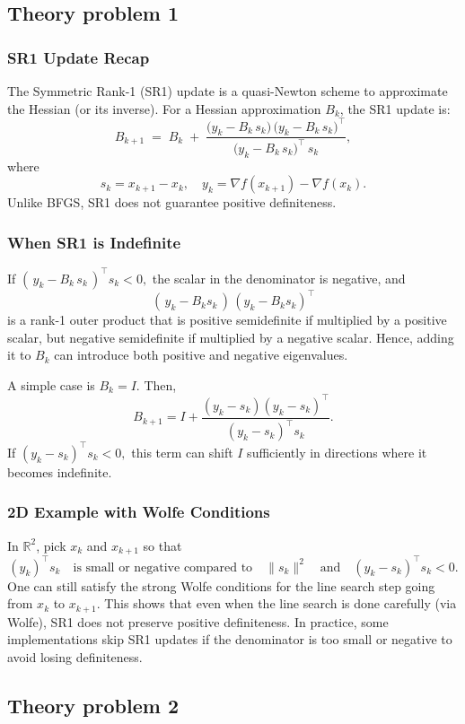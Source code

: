 \documentclass[a4paper,12pt]{article}
\begin{document}
\subsection{Theory problem 1}
\subsubsection*{SR1 Update Recap}
The Symmetric Rank-1 (SR1) update is a quasi-Newton scheme to approximate the Hessian (or its inverse). For a Hessian approximation $B_k$, the SR1 update is:
\[
  B_{k+1} 
  \;=\; 
  B_k 
  \;+\;
  \frac{\bigl(y_k - B_k \, s_k \bigr)\,\bigl(y_k - B_k \, s_k \bigr)^\top}
       {\bigl(y_k - B_k \, s_k \bigr)^\top \, s_k},
\]
where 
\[
  s_k = x_{k+1} - x_k, 
  \quad
  y_k = \nabla f(x_{k+1}) - \nabla f(x_k).
\]
Unlike BFGS, SR1 does not guarantee positive definiteness.

\subsubsection*{When SR1 is Indefinite}
If $(\,y_k - B_k\,s_k\,)^\top s_k < 0,$ the scalar in the denominator is negative, and
\[
  (\,y_k - B_k s_k\,)\,(y_k - B_k s_k)^\top
\]
is a rank-1 outer product that is positive semidefinite if multiplied by a positive scalar, but negative semidefinite if multiplied by a negative scalar. Hence, adding it to $B_k$ can introduce both positive and negative eigenvalues.  
\par
A simple case is $B_k = I$. Then,
\[
  B_{k+1} 
  = 
  I 
  + 
  \frac{(y_k - s_k)(y_k - s_k)^\top}{(y_k - s_k)^\top s_k}.
\]
If $(y_k - s_k)^\top s_k < 0,$ this term can shift $I$ sufficiently in directions where it becomes indefinite.  

\subsubsection*{2D Example with Wolfe Conditions}
In $\mathbb{R}^2$, pick $x_k$ and $x_{k+1}$ so that
\[
  (y_k)^\top s_k
  \quad
  \text{is small or negative compared to}
  \quad
  \|s_k\|^2
  \quad
  \text{and}
  \quad
  (y_k - s_k)^\top s_k<0.
\]
One can still satisfy the strong Wolfe conditions for the line search step going from $x_k$ to $x_{k+1}$. This shows that even when the line search is done carefully (via Wolfe), SR1 does not preserve positive definiteness. In practice, some implementations skip SR1 updates if the denominator is too small or negative to avoid losing definiteness.


\subsection{Theory problem 2}
\end{document}
